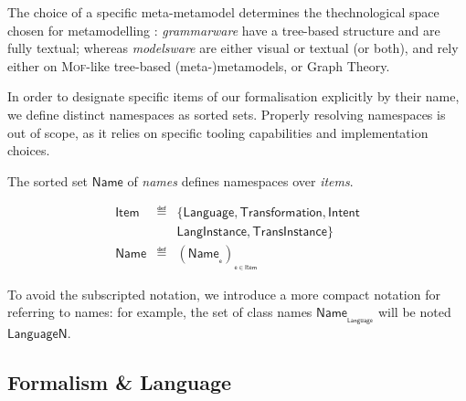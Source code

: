 The choice of a specific meta-metamodel determines the thechnological space 
chosen for metamodelling \cite{Wimmer-Kramler:2005}: \emph{grammarware} have a 
tree-based structure and are fully textual; whereas \emph{modelsware} are either 
visual or textual (or both), and rely either on \textsc{Mof}-like tree-based 
(meta-)metamodels, or Graph Theory. 



In order to designate specific items of our formalisation explicitly by their 
name, we define distinct namespaces as sorted sets. Properly resolving 
namespaces is out of scope, as it relies on specific tooling 
capabilities and implementation choices.

\begin{Definition}[Names]
   The sorted set $\mathsf{Name}$ of \emph{names} defines namespaces over 
\emph{items}.
   \begin{small}
   \begin{displaymath}
     \begin{array}{rcl}
		\mathsf{Item} & \eqdef & \{\mathsf{Language}, \mathsf{Transformation}, 
\mathsf{Intent}\\
                    &        & \mathsf{LangInstance}, \mathsf{TransInstance}\}\\
		\mathsf{Name}    & \eqdef & (\mathsf{Name}_{_{\mathsf{e}}})_{_{\mathsf{e} 
\in \mathsf{Item}}}
      \end{array}
\end{displaymath}
   \end{small}
\end{Definition}
To avoid the subscripted notation, we introduce a more compact notation for 
referring to names: for example, the set of class names 
$\mathsf{Name_{_{Language}}}$ will be noted $\mathsf{LanguageN}$.  

\subsection{Formalism \& Language}
\label{sec:Formalism-Language}

